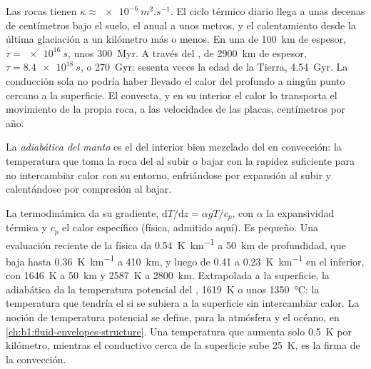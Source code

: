 Las rocas tienen $\kappa \approx \qty{e-6}{m^2.s^{-1}}$. El ciclo térmico diario llega a unas decenas de centímetros
bajo el suelo, el anual a unos metros, y el calentamiento desde la última glaciación a un kilómetro
más o menos. En una  de \qty{100}{km} de espesor, $\tau = \qty{e16}{s}$, unos \qty{300}{Myr}. A través
del , de \qty{2900}{km} de espesor, $\tau = \qty{8.4e18}{s}$, o \qty{270}{Gyr}: sesenta veces la edad
de la Tierra, \qty{4.54}{Gyr}. %
La conducción sola no podría haber llevado el calor del  profundo a ningún punto cercano a la superficie.
El  convecta, y en su interior el calor lo transporta el movimiento de la propia roca, a las velocidades
de las placas, centímetros por año. %

\begin{definition}\label{def:b1:heat-budget:adiabat}
La \emph{adiabática del manto} es el  del interior bien mezclado del  en convección: la
temperatura que toma la roca del  al subir o bajar con la rapidez suficiente para no intercambiar calor con su entorno,
enfriándose por expansión al subir y calentándose por compresión al bajar.
\end{definition}

La termodinámica da su gradiente, $\mathrm dT/\mathrm dz = \alpha g T/c_p$, con $\alpha$ la expansividad térmica y $c_p$
el calor específico (física, admitido aquí). Es pequeño. Una evaluación reciente de la física  da
\qty{0.54}{K.km^{-1}} a \qty{50}{km} de profundidad, que baja hasta \qty{0.36}{K.km^{-1}} a \qty{410}{km}, y luego de 0.41 a
\qty{0.23}{K.km^{-1}} en el  inferior, con \qty{1646}{K} a \qty{50}{km} y \qty{2587}{K} a \qty{2800}{km}.
Extrapolada a la superficie, la adiabática da la temperatura potencial del , \qty{1619}{K} o unos \qty{1350}{\degreeCelsius}:
la temperatura que tendría el  si se subiera a la superficie sin intercambiar calor. La noción de temperatura potencial se
define, para la atmósfera y el océano, en \cref{ch:b1:fluid-envelopes-structure}. Una temperatura que aumenta solo \qty{0.5}{K}
por kilómetro, mientras el  conductivo cerca de la superficie sube \qty{25}{K}, es la firma de la convección.

